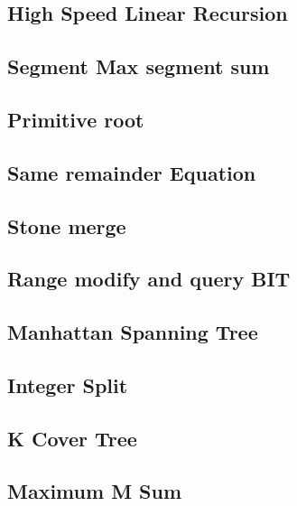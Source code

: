 \documentclass[a4paper,10pt,twocolumn,oneside]{article}
\begin{document}
\subsection{High Speed Linear Recursion}


\subsection{Segment Max segment sum}


\subsection{Primitive root}


\subsection{Same remainder Equation}


\subsection{Stone merge}


\subsection{Range modify and query BIT}


\subsection{Manhattan Spanning Tree}


\subsection{Integer Split}


\subsection{K Cover Tree}


\subsection{Maximum M Sum}

\end{document}
